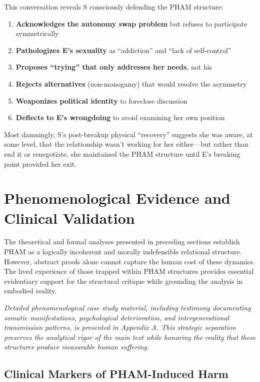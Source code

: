 \documentclass[12pt,openany]{book}
\numberwithin{equation}{chapter}
\begin{document}
This conversation reveals S consciously defending the PHAM structure:

\begin{enumerate}
    \item \textbf{Acknowledges the autonomy swap problem} but refuses to participate symmetrically
    \item \textbf{Pathologizes E's sexuality} as ``addiction'' and ``lack of self-control''
    \item \textbf{Proposes ``trying'' that only addresses her needs}, not his
    \item \textbf{Rejects alternatives} (non-monogamy) that would resolve the asymmetry
    \item \textbf{Weaponizes political identity} to foreclose discussion
    \item \textbf{Deflects to E's wrongdoing} to avoid examining her own position
\end{enumerate}

Most damningly, S's post-breakup physical ``recovery'' suggests she was aware, at some level, that the relationship wasn't working for her either---but rather than end it or renegotiate, she maintained the PHAM structure until E's breaking point provided her exit.

\section{Phenomenological Evidence and Clinical Validation}

The theoretical and formal analyses presented in preceding sections establish PHAM as a logically incoherent and morally indefensible relational structure. However, abstract proofs alone cannot capture the human cost of these dynamics. The lived experience of those trapped within PHAM structures provides essential evidentiary support for the structural critique while grounding the analysis in embodied reality.

\textit{Detailed phenomenological case study material, including testimony documenting somatic manifestations, psychological deterioration, and intergenerational transmission patterns, is presented in Appendix A. This strategic separation preserves the analytical rigor of the main text while honoring the reality that these structures produce measurable human suffering.}

\subsection{Clinical Markers of PHAM-Induced Harm}
\end{document}
